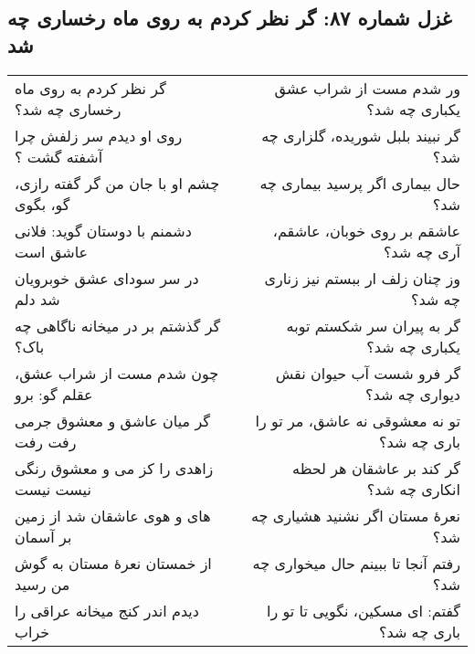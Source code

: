 \begin{center}
\section*{غزل شماره ۸۷: گر نظر کردم به روی ماه رخساری چه شد}
\label{sec:087}
\begin{longtable}{l p{0.5cm} r}
گر نظر کردم به روی ماه رخساری چه شد؟
&&
ور شدم مست از شراب عشق یکباری چه شد؟
\\
روی او دیدم سر زلفش چرا آشفته گشت ؟
&&
گر نبیند بلبل شوریده، گلزاری چه شد؟
\\
چشم او با جان من گر گفته رازی، گو، بگوی
&&
حال بیماری اگر پرسید بیماری چه شد؟
\\
دشمنم با دوستان گوید: فلانی عاشق است
&&
عاشقم بر روی خوبان، عاشقم، آری چه شد؟
\\
در سر سودای عشق خوبرویان شد دلم
&&
وز چنان زلف ار ببستم نیز زناری چه شد؟
\\
گر گذشتم بر در میخانه ناگاهی چه باک؟
&&
گر به پیران سر شکستم توبه یکباری چه شد؟
\\
چون شدم مست از شراب عشق، عقلم گو: برو
&&
گر فرو شست آب حیوان نقش دیواری چه شد؟
\\
گر میان عاشق و معشوق جرمی رفت رفت
&&
تو نه معشوقی نه عاشق، مر تو را باری چه شد؟
\\
زاهدی را کز می و معشوق رنگی نیست نیست
&&
گر کند بر عاشقان هر لحظه انکاری چه شد؟
\\
های و هوی عاشقان شد از زمین بر آسمان
&&
نعرهٔ مستان اگر نشنید هشیاری چه شد؟
\\
از خمستان نعرهٔ مستان به گوش من رسید
&&
رفتم آنجا تا ببینم حال میخواری چه شد؟
\\
دیدم اندر کنج میخانه عراقی را خراب
&&
گفتم: ای مسکین، نگویی تا تو را باری چه شد؟
\\
\end{longtable}
\end{center}
